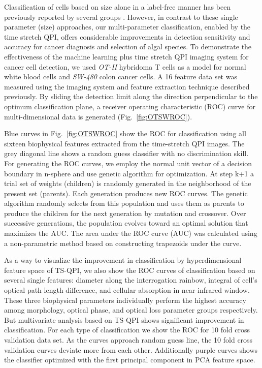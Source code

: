 \documentclass[aps,pra,reprint,superscriptaddress]{revtex4-1}
\begin{document}
Classification of cells based on size alone in a label-free manner has been previously reported by several groups \cite{vona2000isolation}. However, in contrast to these single parameter (size) approaches, our multi-parameter classification, enabled by the time stretch QPI, offers considerable improvements in detection sensitivity and accuracy for cancer diagnosis and selection of algal species. To demonstrate the effectiveness of the machine learning plus time stretch QPI imaging system for cancer cell detection, we used \textit{OT-II} hybridoma T cells as a model for normal white blood cells and \textit{SW-480} colon cancer cells. A 16 feature data set was measured using the imaging system and feature extraction technique described previously. By sliding the detection limit along the direction perpendicular to the optimum classification plane, a receiver operating characteristic (ROC) curve for multi-dimensional data is generated (Fig.~\ref{fig:OTSWROC}).

Blue curves in Fig.~\ref{fig:OTSWROC} show the ROC for classification using all sixteen biophysical features extracted from the time-stretch QPI images. The grey diagonal line shows a random guess classifier with no discrimination skill. For generating the ROC curves, we employ the normal unit vector of a decision boundary in n-sphere and use genetic algorithm for optimization. At step k+1 a trial set of weights (children) is randomly generated in the neighborhood of the present set (parents). Each generation produces new ROC curves. The genetic algorithm randomly selects from this population and uses them as parents to produce the children for the next generation by mutation and crossover. Over successive generations, the population evolves toward an optimal solution that maximizes the AUC. The area under the ROC curve (AUC) was calculated using a non-parametric method based on constructing trapezoids under the curve.

As a way to visualize the improvement in classification by hyperdimensional feature space of TS-QPI, we also show the ROC curves of classification based on several single features: diameter along the interrogation rainbow, integral of cell's optical path length difference, and cellular absorption in near-infrared window. These three biophysical parameters individually perform the highest accuracy among morphology, optical phase, and optical loss parameter groups respectively. But multivariate analysis based on TS-QPI shows significant improvement in classification. For each type of classification we show the ROC for 10 fold cross validation data set. As the curves approach random guess line, the 10 fold cross validation curves deviate more from each other. Additionally purple curves shows the classifier optimized with the first principal component in PCA feature space.
\end{document}
